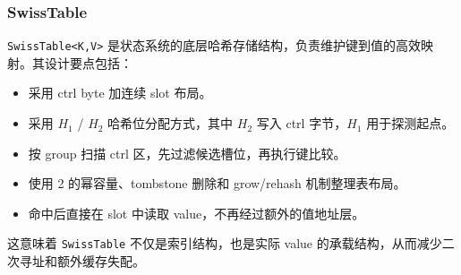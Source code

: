 \documentclass[a4paper,11pt]{article}
\begin{document}
\subsubsection{SwissTable}

\texttt{SwissTable<K,V>} 是状态系统的底层哈希存储结构，负责维护键到值的高效映射。其设计要点包括：

\begin{itemize}
  \item 采用 ctrl byte 加连续 slot 布局。
  \item 采用 \(H_1\) / \(H_2\) 哈希位分配方式，其中 \(H_2\) 写入 ctrl 字节，\(H_1\) 用于探测起点。
  \item 按 group 扫描 ctrl 区，先过滤候选槽位，再执行键比较。
  \item 使用 2 的幂容量、tombstone 删除和 grow/rehash 机制整理表布局。
  \item 命中后直接在 slot 中读取 value，不再经过额外的值地址层。
\end{itemize}

这意味着 \texttt{SwissTable} 不仅是索引结构，也是实际 value 的承载结构，从而减少二次寻址和额外缓存失配。
\end{document}
